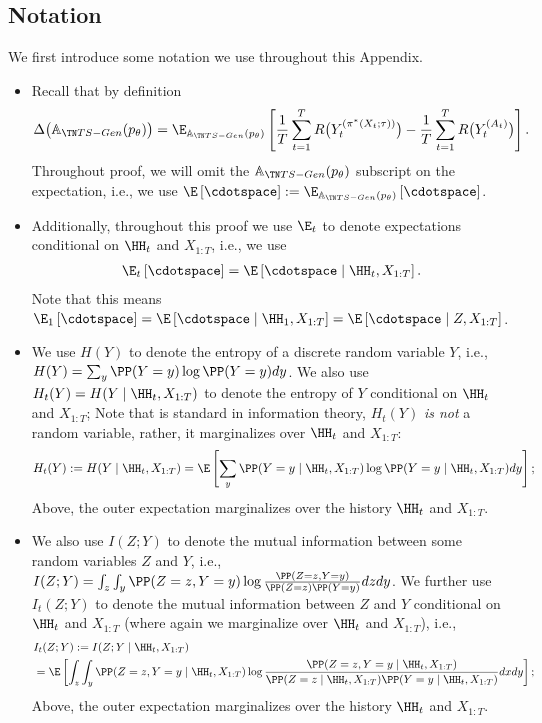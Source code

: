 \subsection{Notation}
We first introduce some notation we use throughout this Appendix.
\begin{itemize}
    \item Recall that by definition 
    \begin{align*}
        \Delta \big( \psar(p_\theta ) \big) = \E_{\psar(p_\theta )} \left[  \frac{1}{T} \sum_{t=1}^{T} R \big( Y_t^{(\pi^*(X_t; \tau))} \big) - \frac{1}{T} \sum_{t=1}^{T} R \big( Y_{t}^{(A_t)} \big)\right].
    \end{align*}
    Throughout proof, we will omit the $\psar(p_\theta )$ subscript on the expectation, i.e., we use $\E \left[ \cdotspace \right] := \E_{\psar(p_\theta )} \left[ \cdotspace \right]$. 
    \item Additionally, throughout this proof we use $\E_t$ to denote expectations conditional on $\HH_t$ and $X_{1:T}$, i.e., we use 
    \begin{align}
        \label{eqn:EtDefinition}
        \E_t \left[ \cdotspace \right] = \E \left[ \cdotspace \mid \HH_t, X_{1:T} \right].
    \end{align}
    Note that this means $\E_1\left[ \cdotspace \right] = \E \left[ \cdotspace \mid \HH_1, X_{1:T} \right]= \E \left[ \cdotspace \mid Z, X_{1:T} \right]$.
    \item We use $H(Y)$ to denote the entropy of a discrete random variable $Y$, i.e., $H(Y) = \sum_y \PP(Y = y) \log \PP(Y = y) dy$. We also use $H_t(Y) = H(Y \mid \HH_t, X_{1:T})$ to denote the entropy of $Y$ conditional on $\HH_t$ and $X_{1:T}$; Note that is standard in information theory, $H_t(Y)$ \textit{is not} a random variable, rather, it marginalizes over $\HH_t$ and $X_{1:T}$:
    \begin{align*}
        H_t(Y) := 
        H(Y \mid \HH_t, X_{1:T}) = \E \left[ \sum_y \PP(Y = y \mid \HH_t, X_{1:T}) \log \PP(Y = y \mid \HH_t, X_{1:T}) dy \right];
    \end{align*}
    Above, the outer expectation marginalizes over the history $\HH_t$ and $X_{1:T}$.
    \item We also use $I(Z;Y)$ to denote the mutual information between some random variables $Z$ and $Y$, i.e., $I(Z;Y) = \int_z \int_y \PP(Z = z, Y=y) \log \frac{\PP(Z = z, Y=y)}{\PP(Z = z) \PP(Y=y)} dz dy$. We further use $I_t(Z; Y)$ to denote the mutual information between $Z$ and $Y$ conditional on $\HH_t$ and $X_{1:T}$ (where again we marginalize over $\HH_t$ and $X_{1:T}$), i.e.,
    \begin{align}
        &I_t(Z;Y) := I(Z;Y \mid \HH_t, X_{1:T}) \nonumber \\
        &= \E \left[ \int_z \int_y \PP(Z = z, Y=y \mid \HH_t, X_{1:T}) \log \frac{\PP(Z = z, Y=y\mid \HH_t, X_{1:T})}{\PP(Z = z\mid \HH_t, X_{1:T}) \PP(Y=y\mid \HH_t, X_{1:T})} dx dy \right];
        \label{eqn:mutualInfoDef}
    \end{align}
    Above, the outer expectation marginalizes over the history $\HH_t$ and $X_{1:T}$. 
\end{itemize}


